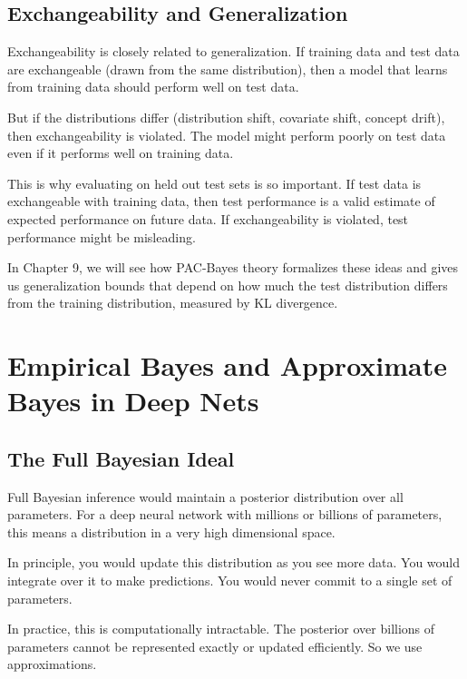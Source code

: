 \vspace{1.5em}

\subsection{Exchangeability and Generalization}

Exchangeability is closely related to generalization. If training data and test data are exchangeable (drawn from the same distribution), then a model that learns from training data should perform well on test data.

But if the distributions differ (distribution shift, covariate shift, concept drift), then exchangeability is violated. The model might perform poorly on test data even if it performs well on training data.

This is why evaluating on held out test sets is so important. If test data is exchangeable with training data, then test performance is a valid estimate of expected performance on future data. If exchangeability is violated, test performance might be misleading.

In Chapter 9, we will see how PAC-Bayes theory formalizes these ideas and gives us generalization bounds that depend on how much the test distribution differs from the training distribution, measured by KL divergence.

\vspace{2em}

\section{Empirical Bayes and Approximate Bayes in Deep Nets}

\subsection{The Full Bayesian Ideal}

Full Bayesian inference would maintain a posterior distribution over all parameters. For a deep neural network with millions or billions of parameters, this means a distribution in a very high dimensional space.

In principle, you would update this distribution as you see more data. You would integrate over it to make predictions. You would never commit to a single set of parameters.

In practice, this is computationally intractable. The posterior over billions of parameters cannot be represented exactly or updated efficiently. So we use approximations.

